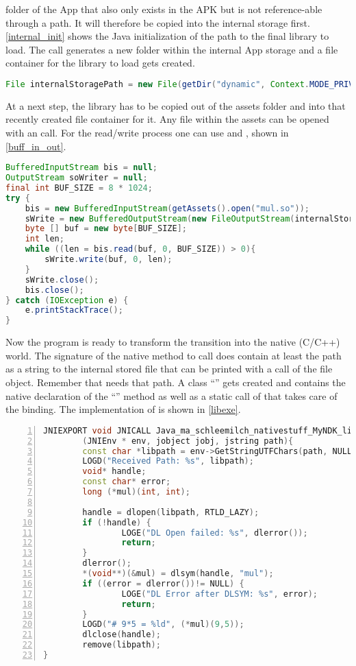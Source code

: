  folder of the App that also only exists in the APK but is not 
reference-able through a path. It will therefore be copied into the internal storage first. \autoref{internal_init} shows the Java initialization of the path to the final library to load. The  call generates a new folder within the internal App storage and a file container for the library to load gets created. 
\begin{lstlisting}[language=Java, caption=Internal Storage Initialization, label=internal_init]
File internalStoragePath = new File(getDir("dynamic", Context.MODE_PRIVATE), "mul.so");
\end{lstlisting}
At a next step, the library has to be copied out of the assets folder and into that 
recently created file container for it. Any file within the assets can be opened with an
 call. For the read/write process one can use
 and , shown in 
\autoref{buff_in_out}.
\begin{lstlisting}[language=Java, caption=Buffered Input/Output, label=buff_in_out]
BufferedInputStream bis = null;
OutputStream soWriter = null;
final int BUF_SIZE = 8 * 1024;
try {
    bis = new BufferedInputStream(getAssets().open("mul.so"));
    sWrite = new BufferedOutputStream(new FileOutputStream(internalStoragePath));
    byte [] buf = new byte[BUF_SIZE];
    int len;
    while ((len = bis.read(buf, 0, BUF_SIZE)) > 0){
        sWrite.write(buf, 0, len);
    }
    sWrite.close();
    bis.close();
} catch (IOException e) {
    e.printStackTrace();
}
\end{lstlisting}
Now the program is ready to transform the transition into the native (C/C++) world.
The signature of the native method to call does contain at least the path as a string to
the internal stored file that can be printed with a  call of the
 file object. Remember that  needs that path.
A class ``'' gets created and contains the native declaration of the
``'' method as well as a static call of 
 that takes care of the binding. 
The implementation of  is shown in \autoref{libexe}. 
\begin{lstlisting}[language=C++, caption=Native libExe(), label=libexe, numbers=left]
JNIEXPORT void JNICALL Java_ma_schleemilch_nativestuff_MyNDK_libExe
        (JNIEnv * env, jobject jobj, jstring path){
        const char *libpath = env->GetStringUTFChars(path, NULL);
        LOGD("Received Path: %s", libpath);
        void* handle;
        const char* error;
        long (*mul)(int, int);

        handle = dlopen(libpath, RTLD_LAZY);
        if (!handle) {
                LOGE("DL Open failed: %s", dlerror());
                return;
        }
        dlerror();
        *(void**)(&mul) = dlsym(handle, "mul");
        if ((error = dlerror())!= NULL) {
                LOGE("DL Error after DLSYM: %s", error);
                return;
        }
        LOGD("# 9*5 = %ld", (*mul)(9,5));
        dlclose(handle);
        remove(libpath);
}
\end{lstlisting}
